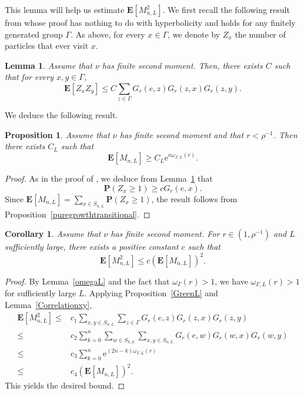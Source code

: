\documentclass{amsart}
\newtheorem{prop}[thm]{Proposition}
\newtheorem{cor}[thm]{Corollary}
\newtheorem{lem}[thm]{Lemma}
\theoremstyle{definition}
\theoremstyle{remark}
\begin{document}
This lemma will help us estimate $\mathbf E \left [M_{n,L}^2\right ]$.
We first recall the following result from \cite{SWX} whose proof has nothing to do with hyperbolicity and holds for any finitely generated group $\Gamma$.
As above, for every $x\in \Gamma$, we denote by $Z_x$ the number of particles that ever visit $x$.

\begin{lem}\label{4.3SWX}
Assume that $\nu$ has finite second moment.
Then, there exists $C$ such that for every $x,y\in \Gamma$,
$$\mathbf E[Z_xZ_y]\leq  C \sum_{z\in \Gamma}G_r(e,z)G_r(z,x)G_r(z,y).$$
\end{lem}



We deduce the following result.

\begin{prop}\label{Coro4.4L}
Assume that $\nu$ has finite second moment and that $r<\rho^{-1}$.
Then there exists $C_L$ such that
$$\mathbf{E}[M_{n,L}]\geq C_L \mathrm{e}^{n\omega_{\Gamma,L}(r)}.$$
\end{prop}

\begin{proof}
As in the proof of \cite[Lemma~4.4]{SWX}, we deduce from Lemma~\ref{4.3SWX} that
$$\mathbf P(Z_x\geq 1)\geq c G_r(e,x).$$
Since $\mathbf{E} [M_{n,L}]=\sum_{x\in S_{n,L}}\mathbf P(Z_x\geq 1)$, the result follows from Proposition~\ref{puregrowthtransitional}.
\end{proof}


\begin{cor}\label{GreenLmoment}
Assume that $\nu$ has finite second moment.  For $r \in (1, \rho^{-1})$ and $L$ sufficiently large, there exists a positive constant $c$ such that
$$\mathbf{E} \left[ M_{n, L}^2 \right] \leq c \left( \mathbf{E}[M_{n, L}] \right)^2.$$ 
\end{cor}

\begin{proof}
By Lemma~\ref{omegaL} and the fact that $\omega_{\Gamma}(r) > 1$, we have $\omega_{\Gamma, L}(r) > 1$ for sufficiently large $L$.  Applying Proposition~\ref{GreenL} and Lemma~\ref{Correlationxy},
  \begin{align*}
    \mathbf{E} \left[ M_{n, L}^2 \right]
    \leq&
          c_1 \sum_{x, y \in S_{n, L}} \sum_{z \in \Gamma} G_r(e, z) G_r(z, x) G_r(z, y) \\
    \leq&
          c_2 \sum_{k=0}^n \sum_{w \in S_{k, L}} \sum_{x, y \in S_{n, L}} G_r(e, w) G_r(w, x) G_r(w, y) \\
    \leq&
          c_3 \sum_{k=0}^n \mathrm{e}^{(2n - k) \omega_{\Gamma, L}(r)} \\
    \leq&
          c_4 \left( \mathbf{E}[M_{n, L}] \right)^2.   
  \end{align*}
This yields the desired bound.
\end{proof}
\end{document}
